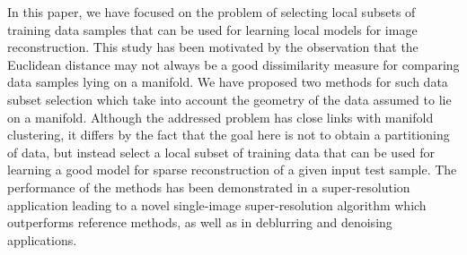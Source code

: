 \documentclass[journal]{IEEEtran}
\begin{document}
In this paper, we have focused on the problem of selecting local subsets of training data samples that can be used for learning local models for image reconstruction. This study has been motivated by the observation that the Euclidean distance may not always be a good dissimilarity measure for comparing data samples lying on a manifold. We have proposed two methods for such data subset selection which take into account the geometry of the data assumed to lie on a manifold.  Although the addressed problem has close links with manifold clustering, it differs by the fact that the goal here is not to obtain a partitioning of data, but instead select a local subset of training data that can be used for learning a good model for sparse reconstruction of a given input test sample. 
The performance of the methods has been demonstrated in a super-resolution application leading to a novel single-image super-resolution algorithm which outperforms reference methods, as well as in deblurring and denoising applications.



%


\end{document}
